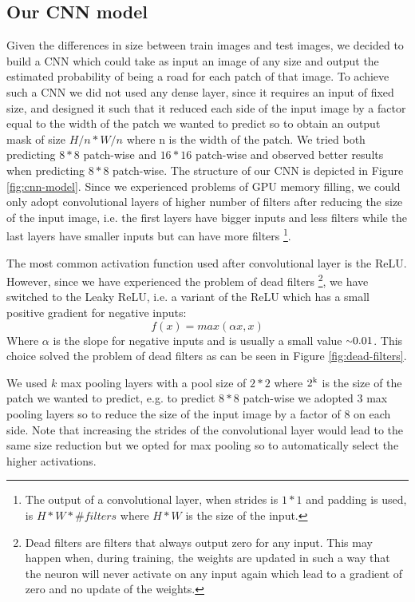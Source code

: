 \documentclass[10pt,conference,compsocconf]{IEEEtran}
\begin{document}
\subsection{Our CNN model}
Given the differences in size between train images and test images, we decided to build a CNN which could take as input an image of any size and output the estimated probability of being a road for each patch of that image. To achieve such a CNN we did not used any dense layer, since it requires an input of fixed size, and designed it such that it reduced each side of the input image by a factor equal to the width of the patch we wanted to predict so to obtain an output mask of size $H/n*W/n$ where n is the width of the patch. We tried both predicting $8*8$ patch-wise and $16*16$ patch-wise and observed better results when predicting $8*8$ patch-wise. The structure of our CNN is depicted in Figure \ref{fig:cnn-model}. Since we experienced problems of GPU memory filling, we could only adopt convolutional layers of higher number of filters after reducing the size of the input image, i.e. the first layers have bigger inputs and less filters while the last layers have smaller inputs but can have more filters \footnote{The output of a convolutional layer, when strides is $1*1$ and padding is used, is $H * W * \#filters$ where $H*W$ is the size of the input.}. 

The most common activation function used after convolutional layer is the ReLU. However, since we have experienced the problem of dead filters \footnote{Dead filters are filters that always output zero for any input. This may happen when, during training, the weights are updated in such a way that the neuron will never activate on any input again which lead to a gradient of zero and no update of the weights.}, we have switched to the Leaky ReLU, i.e. a variant of the ReLU which has a small positive gradient for negative inputs: 
$$f(x)=max(\alpha x, x)$$
Where $\alpha$ is the slope for negative inputs and is usually a small value ${\raise.17ex\hbox{$\scriptstyle\sim$}}0.01$.
This choice solved the problem of dead filters as can be seen in Figure \ref{fig:dead-filters}.

We used $k$ max pooling layers with a pool size of $2*2$ where $2\textsuperscript{k}$ is the size of the patch we wanted to predict, e.g. to predict $8*8$ patch-wise we adopted 3 max pooling layers so to reduce the size of the input image by a factor of 8 on each side. Note that increasing the strides of the convolutional layer would lead to the same size reduction but we opted for max pooling so to automatically select the higher activations. 
\end{document}
